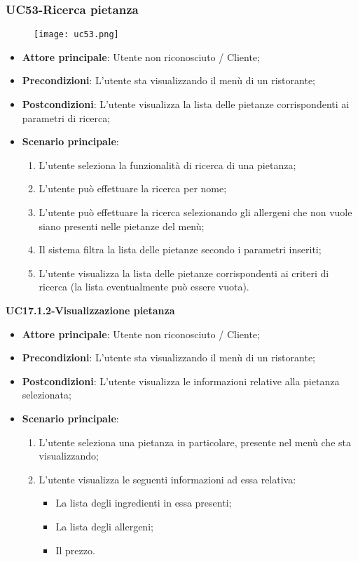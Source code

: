 \subsubsection{UC53-Ricerca pietanza}
\begin{figure}[h] \texttt{[image: uc53.png]} \end{figure}

\begin{itemize}
\item \textbf{Attore principale}: Utente non riconosciuto / Cliente;
\item \textbf{Precondizioni}: L'utente sta visualizzando il menù di un ristorante;
\item \textbf{Postcondizioni}: L'utente visualizza la lista delle pietanze corrispondenti ai parametri di ricerca;
\item \textbf{Scenario principale}:
\begin{enumerate}
\item L'utente seleziona la funzionalità di ricerca di una pietanza;
\item L'utente può effettuare la ricerca per nome;
\item L'utente può effettuare la ricerca selezionando gli allergeni che non vuole siano presenti nelle pietanze del menù;
\item Il sistema filtra la lista delle pietanze secondo i parametri inseriti;
\item L'utente visualizza la lista delle pietanze corrispondenti ai criteri di ricerca (la lista eventualmente può essere vuota).
\end{enumerate}
\end{itemize}

\textbf{UC17.1.2-Visualizzazione pietanza}

\begin{itemize}
\item \textbf{Attore principale}: Utente non riconosciuto / Cliente;
\item \textbf{Precondizioni}: L'utente sta visualizzando il menù di un ristorante;
\item \textbf{Postcondizioni}: L'utente visualizza le informazioni relative alla pietanza selezionata;
\item \textbf{Scenario principale}:
\begin{enumerate}
\item L'utente seleziona una pietanza in particolare, presente nel menù che sta visualizzando;
\item L'utente visualizza le seguenti informazioni ad essa relativa:
\begin{itemize}
\item La lista degli ingredienti in essa presenti;
\item La lista degli allergeni;
\item Il prezzo.
\end{itemize}
\end{enumerate}
\end{itemize}

